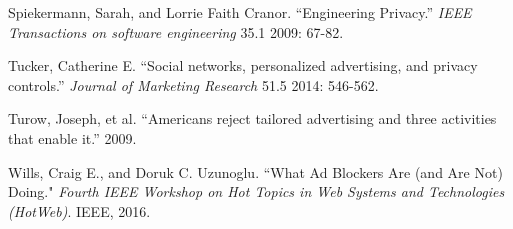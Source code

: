 \documentclass[conference]{IEEEtran}
\begin{document}
\begin{thebibliography}{99}
 Spiekermann, Sarah, and Lorrie Faith Cranor. “Engineering Privacy.” \textit{IEEE Transactions on software engineering} 35.1 2009: 67-82.

 Tucker, Catherine E. “Social networks, personalized advertising, and privacy controls.” \textit{Journal of Marketing Research} 51.5 2014: 546-562.

 Turow, Joseph, et al. “Americans reject tailored advertising and three activities that enable it.” 2009.

 Wills, Craig E., and Doruk C. Uzunoglu. “What Ad Blockers Are (and Are Not) Doing." \textit{Fourth IEEE Workshop on Hot Topics in Web Systems and Technologies (HotWeb)}. IEEE, 2016.

\end{thebibliography}
\end{document}
